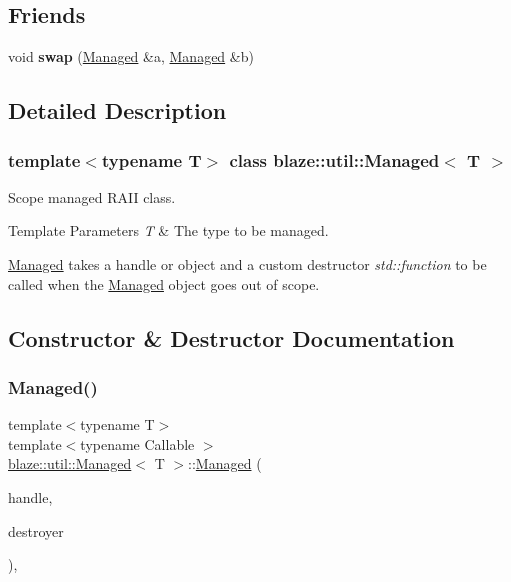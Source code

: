\subsection*{Friends}
\begin{DoxyCompactItemize}
\item 
\mbox{\label{classblaze_1_1util_1_1Managed_a3d12bd311077606be9f6ab39aa7ac91d}} 
void {\bfseries swap} (\hyperlink{classblaze_1_1util_1_1Managed}{Managed} \&a, \hyperlink{classblaze_1_1util_1_1Managed}{Managed} \&b)
\end{DoxyCompactItemize}


\subsection{Detailed Description}
\subsubsection*{template$<$typename T$>$\newline
class blaze\+::util\+::\+Managed$<$ T $>$}

Scope managed R\+A\+II class. 


\begin{DoxyTemplParams}{Template Parameters}
{\em T} & The type to be managed.\\
\hline
\end{DoxyTemplParams}
\hyperlink{classblaze_1_1util_1_1Managed}{Managed} takes a handle or object and a custom destructor {\itshape std\+::function} to be called when the \hyperlink{classblaze_1_1util_1_1Managed}{Managed} object goes out of scope. 

\subsection{Constructor \& Destructor Documentation}
\mbox{\label{classblaze_1_1util_1_1Managed_a1fbcd3a25982f170ba9ca3cd9feaee0b}} 
\subsubsection{\texorpdfstring{Managed()}{Managed()}}
{\footnotesize\ttfamily template$<$typename T$>$ \\
template$<$typename Callable $>$ \\
\hyperlink{classblaze_1_1util_1_1Managed}{blaze\+::util\+::\+Managed}$<$ T $>$\+::\hyperlink{classblaze_1_1util_1_1Managed}{Managed} (\begin{DoxyParamCaption}\item[{T}]{handle,  }\item[{Callable}]{destroyer }\end{DoxyParamCaption})\hspace{0.3cm}{\ttfamily [inline]}, {\ttfamily [noexcept]}}


